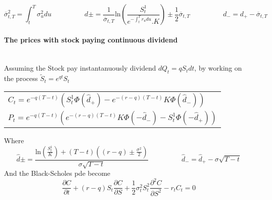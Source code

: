 \documentclass[a4paper,10pt]{article}
\begin{document}
\[
\overline{\sigma}^2_{t,T} = \int^T_t \sigma^2_u du
\hspace{2cm}
d\pm =  \frac{1}{\overline{\sigma}_{t,T}} \text{ln}(\frac{S^1_t}{e^{- \int^T_t r_udu }.K}) \pm \frac{1}{2}\overline{\sigma}_{t,T}
\hspace{2cm}
d_- = d_+  - \overline{\sigma}_{t,T}
\]
\paragraph{The prices with stock paying continuous dividend} \mbox{} \\
Assuming the Stock pay instantanuously dividend $dQ_t = q S_t dt$, by working on the process $\tilde{S}_t=e^{qt}S_t$ 
\begin{center}
\begin{tabular}{l}
$C_t = e^{-q(T-t)} \left( S^1_t \Phi(\hat{d}_+) - e^{-(r-q)(T-t)} K \Phi(\hat{d}_-)   \right) $ \\[6pt]
$P_t = e^{-q(T-t)} \left( e^{-(r-q)(T-t)} K \Phi(-\hat{d}_-) - S^1_t \Phi(-\hat{d}_+) \right) $
\end{tabular}
\end{center}
Where
\[
\hat{d}\pm = \frac{ \text{ln}(\frac{S^1_t}{K}) + (T-t)( (r-q) \pm \frac{\sigma^2}{2})  }{\sigma \sqrt{T-t}} 
\hspace{2cm}
\hat{d}_- = \hat{d}_+  - \sigma \sqrt{T-t}
\]
And the Black-Scholes pde become
\[
\frac{\partial C}{\partial t} +
(r - q)S_t \frac{\partial C}{\partial S} + 
\frac{1}{2}\sigma^2_tS^2_t \frac{\partial^2 C}{\partial S^2} -
r_t C_t =0
\]
\end{document}
